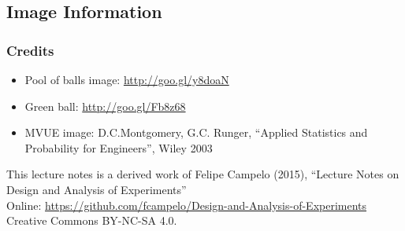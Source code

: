 \documentclass[10pt]{beamer}
\begin{document}
\subsection{Image Information}
\begin{frame}
  \frametitle{Credits}
  {\smaller
  \begin{itemize}
  \item Pool of balls image: \url{http://goo.gl/y8doaN}
  \item Green ball: \url{http://goo.gl/Fb8z68}
  \item MVUE image: D.C.Montgomery, G.C. Runger, ``Applied Statistics and Probability for Engineers'', Wiley 2003
  \end{itemize}
  \medskip
  \begin{block}{This lecture notes is a derived work of}
    Felipe Campelo (2015), ``Lecture Notes on Design and Analysis of Experiments''\\
    Online: \url{https://github.com/fcampelo/Design-and-Analysis-of-Experiments}
    Creative Commons BY-NC-SA 4.0.
  \end{block}}
\end{frame}
\end{document}

